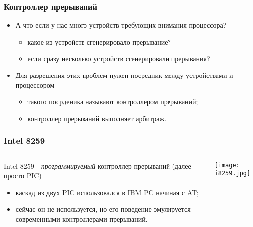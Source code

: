 \begin{frame}
\frametitle{Контроллер прерываний}
\begin{itemize}
  \item А что если у нас много устройств требующих внимания процессора?
  \begin{itemize}
    \item какое из устройств сгенерировало прерывание?
    \item если сразу несколько устройств сгенерировали прерывания?
  \end{itemize}
  \item Для разрешения этих проблем нужен посредник между устройствами и
  процессором
  \begin{itemize}
    \item такого посрденика называют контроллером прерываний;
    \item контроллер прерываний выполняет арбитраж.
  \end{itemize}
\end{itemize}
\end{frame}

\begin{frame}
\frametitle{Intel 8259}
\begin{columns}
  \begin{column}{0.7\textwidth}
  Intel 8259 - \emph{программируемый} контроллер прерываний (далее просто PIC)
  \begin{itemize}
    \item каскад из двух PIC использовался в IBM PC начиная с AT;
    \item сейчас он не используется, но его поведение эмулируется современными
    контроллерами прерываний.
  \end{itemize}
  \end{column}
  \begin{column}{0.3\textwidth}
    \begin{center}
      \texttt{[image: i8259.jpg]}
    \end{center}
  \end{column}
\end{columns}
\end{frame}

